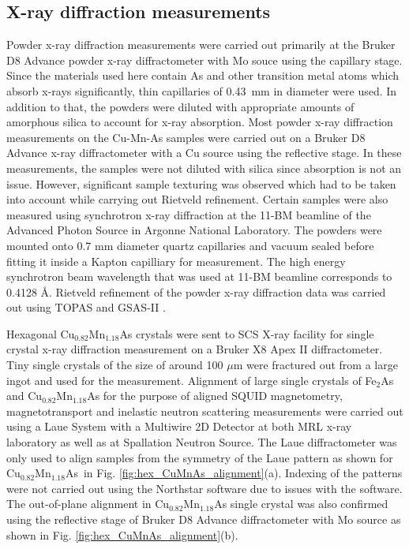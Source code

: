 \documentclass[letterpaper,10pt,doublespacing,edeposit]{uiucthesis2020}
\newcommand*{\cumnas}{Cu$_{0.82}$Mn$_{1.18}$As}
\begin{document}
\begin{mainmatter}
\subsection{X-ray diffraction measurements}


Powder x-ray diffraction measurements were carried out primarily at the Bruker D8 Advance powder x-ray diffractometer with Mo souce using the capillary stage. Since the materials used here contain As and other transition metal atoms which absorb x-rays significantly, thin capillaries of 0.43~mm in diameter were used. In addition to that, the powders were diluted with appropriate amounts of amorphous silica to account for x-ray absorption. Most powder x-ray diffraction measurements on the Cu-Mn-As samples were carried out on a Bruker D8 Advance x-ray diffractometer with a Cu source using the reflective stage. In these measurements, the samples were not diluted with silica since absorption is not an issue. However, significant sample texturing was observed which had to be taken into account while carrying out Rietveld refinement. Certain samples were also measured using synchrotron x-ray diffraction at the 11-BM beamline of the Advanced Photon Source in Argonne National Laboratory. The powders were mounted onto 0.7 mm diameter quartz capillaries and vacuum sealed before fitting it inside a Kapton capilliary for measurement. The high energy synchrotron beam wavelength that was used at 11-BM beamline corresponds to 0.4128 \AA. Rietveld refinement of the powder x-ray diffraction data was carried out using \textsc{TOPAS} and \textsc{GSAS-II} \cite{Coelho:jo5037,Toby:aj5212}.

Hexagonal Cu$_{0.82}$Mn$_{1.18}$As crystals were sent to SCS X-ray facility for single crystal x-ray diffraction measurement on a Bruker X8 Apex II diffractometer. Tiny single crystals of the size of around 100 $\mu$m were fractured out from a large ingot and used for the measurement. Alignment of large single crystals of Fe$_2$As and Cu$_{0.82}$Mn$_{1.18}$As for the purpose of aligned SQUID magnetometry, magnetotransport and inelastic neutron scattering measurements were carried out using a Laue System with a Multiwire 2D Detector at both MRL x-ray laboratory as well as at Spallation Neutron Source. The Laue diffractometer was only used to align samples from the symmetry of the Laue pattern as shown for \cumnas\ in Fig. \ref{fig:hex_CuMnAs_alignment}(a). Indexing of the patterns were not carried out using the Northstar software due to issues with the software. The out-of-plane alignment in Cu$_{0.82}$Mn$_{1.18}$As single crystal was also confirmed using the reflective stage of Bruker D8 Advance diffractometer with Mo source as shown in Fig. \ref{fig:hex_CuMnAs_alignment}(b).


\end{mainmatter}
\end{document}
